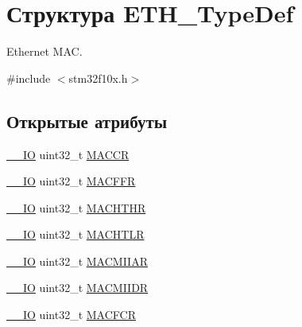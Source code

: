 \hypertarget{struct_e_t_h___type_def}{}\section{Структура E\+T\+H\+\_\+\+Type\+Def}
\label{struct_e_t_h___type_def}


Ethernet M\+AC.  




{\ttfamily \#include $<$stm32f10x.\+h$>$}

\subsection*{Открытые атрибуты}
\begin{DoxyCompactItemize}
\item 
\mbox{\hyperlink{group___c_m_s_i_s___c_m3__core__definitions_gaec43007d9998a0a0e01faede4133d6be}{\+\_\+\+\_\+\+IO}} uint32\+\_\+t \mbox{\hyperlink{struct_e_t_h___type_def_a68d7e7c68b5b8adcf7b2b96bc1eea7d9}{M\+A\+C\+CR}}
\item 
\mbox{\hyperlink{group___c_m_s_i_s___c_m3__core__definitions_gaec43007d9998a0a0e01faede4133d6be}{\+\_\+\+\_\+\+IO}} uint32\+\_\+t \mbox{\hyperlink{struct_e_t_h___type_def_afdf573860dd5dcd13f2b6b19dcb92cc1}{M\+A\+C\+F\+FR}}
\item 
\mbox{\hyperlink{group___c_m_s_i_s___c_m3__core__definitions_gaec43007d9998a0a0e01faede4133d6be}{\+\_\+\+\_\+\+IO}} uint32\+\_\+t \mbox{\hyperlink{struct_e_t_h___type_def_ace541cc94118ec2db7c930a44960aa18}{M\+A\+C\+H\+T\+HR}}
\item 
\mbox{\hyperlink{group___c_m_s_i_s___c_m3__core__definitions_gaec43007d9998a0a0e01faede4133d6be}{\+\_\+\+\_\+\+IO}} uint32\+\_\+t \mbox{\hyperlink{struct_e_t_h___type_def_a22bd30c653a4c1c8f46a59e0a821dcf8}{M\+A\+C\+H\+T\+LR}}
\item 
\mbox{\hyperlink{group___c_m_s_i_s___c_m3__core__definitions_gaec43007d9998a0a0e01faede4133d6be}{\+\_\+\+\_\+\+IO}} uint32\+\_\+t \mbox{\hyperlink{struct_e_t_h___type_def_af697fcc940139f7dcb483766420852be}{M\+A\+C\+M\+I\+I\+AR}}
\item 
\mbox{\hyperlink{group___c_m_s_i_s___c_m3__core__definitions_gaec43007d9998a0a0e01faede4133d6be}{\+\_\+\+\_\+\+IO}} uint32\+\_\+t \mbox{\hyperlink{struct_e_t_h___type_def_a3d4c60bb689285b937c939b36a1233a3}{M\+A\+C\+M\+I\+I\+DR}}
\item 
\mbox{\hyperlink{group___c_m_s_i_s___c_m3__core__definitions_gaec43007d9998a0a0e01faede4133d6be}{\+\_\+\+\_\+\+IO}} uint32\+\_\+t \mbox{\hyperlink{struct_e_t_h___type_def_acdbe493d9d68ddfed4c758f0a7bde058}{M\+A\+C\+F\+CR}}

\end{DoxyCompactItemize}
